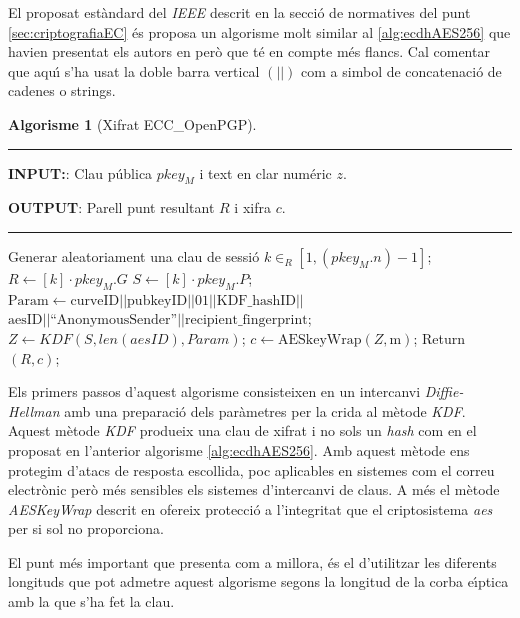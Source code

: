 \documentclass[12pt,twoside,catalan,a4paper]{book}%
\numberwithin{figure}{section}		%
\theoremstyle{definition}   			%
\def\ce{corba e\lgem{}\'{\i}ptica}%
\theoremstyle{saltolinea}   			%
\newtheorem{algo}{Algorisme}
\begin{document}
El proposat est\`andard del \emph{IEEE} descrit en la secci\'o de normatives del punt \ref{sec:criptografiaEC} \'es proposa un algorisme molt similar al \ref{alg:ecdhAES256} que havien presentat els autors en \cite{BM06} per\`o que t\'e en compte m\'es flancs. Cal comentar que aqu\'{\i} s'ha usat la doble barra vertical $\left(||\right)$ com a simbol de concatenaci\'o de cadenes o strings.

\begin{table}[H]
\begin{algo}[Xifrat ECC\_OpenPGP]\label{alg:eccOpenPGP}
 \parbox[b]{\linewidth}{%
\hrule
\smallskip
{\bf INPUT:}: Clau p\'ublica $pkey_{M}$ i text en clar num\'eric $z$.

{\bf OUTPUT}: Parell punt resultant $R$ i xifra $c$.
\vspace{1.5mm}
\hrule
}%
\begin{algorithmic}[1]
\STATE Generar aleatoriament una clau de sessi\'o $k\in_{R}\left[1,\left(pkey_{M}.n\right)-1\right]$;
\STATE $R \leftarrow \left[k\right]\cdot pkey_{M}.G$
\STATE $S \leftarrow \left[k\right]\cdot pkey_{M}.P$; 
\STATE $\textrm{Param}  \leftarrow \textrm{curveID} || \textrm{pubkeyID} || 01 || \textrm{KDF\_hashID} || $\\$ \textrm{aesID} || \textrm{``AnonymousSender''} || \textrm{recipient\_fingerprint}$;
\STATE $Z \leftarrow KDF\left(S,len\left(aesID\right),Param\right)$;\label{alg:eccOpenPGP:kdf}
\STATE $c \leftarrow \textrm{AESkeyWrap}\left(Z,\textrm{m}\right)$;
\STATE Return $(R,c)$;
\end{algorithmic}
\end{algo}
\end{table}

Els primers passos d'aquest algorisme consisteixen en un intercanvi \emph{Diffie-Hellman} amb una preparaci\'o dels par\`ametres per la crida al m\`etode \emph{KDF}. Aquest m\`etode \emph{KDF} produeix una clau de xifrat i no sols un \emph{hash} com en el proposat en l'anterior algorisme \ref{alg:ecdhAES256}. Amb aquest m\`etode ens protegim d'atacs de resposta escollida, poc aplicables en sistemes com el correu electr\`onic per\`o m\'es sensibles els sistemes d'intercanvi de claus. A m\'es el m\`etode \emph{AESKeyWrap} descrit en \cite{3394} ofereix protecci\'o a l'integritat que el criptosistema \emph{aes} per si sol no proporciona.

El punt m\'es important que presenta com a millora, \'es el d'utilitzar les diferents longituds que pot admetre aquest algorisme segons la longitud de la \ce{} amb la que s'ha fet la clau.
\end{document}
